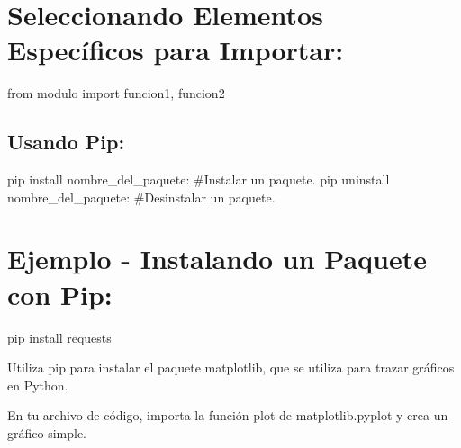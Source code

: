 \documentclass[
  a4paper,
  onepage,
  openany]{scrreprt}
\newenvironment{Shaded}{\begin{snugshade}}{\end{snugshade}}
\newcommand{\CommentTok}[1]{\textcolor[rgb]{0.37,0.37,0.37}{#1}}
\newcommand{\ExtensionTok}[1]{\textcolor[rgb]{0.00,0.23,0.31}{#1}}
\newcommand{\ImportTok}[1]{\textcolor[rgb]{0.00,0.46,0.62}{#1}}
\newcommand{\NormalTok}[1]{\textcolor[rgb]{0.00,0.23,0.31}{#1}}
\begin{document}
\hypertarget{seleccionando-elementos-especuxedficos-para-importar-2}{%
\section{Seleccionando Elementos Específicos para
Importar:}\label{seleccionando-elementos-especuxedficos-para-importar-2}}

\begin{Shaded}
\begin{Highlighting}[]
\ImportTok{from}\NormalTok{ modulo }\ImportTok{import}\NormalTok{ funcion1, funcion2}
\end{Highlighting}
\end{Shaded}

\hypertarget{usando-pip}{%
\subsection{Usando Pip:}\label{usando-pip}}

\begin{Shaded}
\begin{Highlighting}[]
\ExtensionTok{pip}\NormalTok{ install nombre\_del\_paquete: }\CommentTok{\#Instalar un paquete.}
\ExtensionTok{pip}\NormalTok{ uninstall nombre\_del\_paquete: }\CommentTok{\#Desinstalar un paquete.}
\end{Highlighting}
\end{Shaded}

\hypertarget{ejemplo---instalando-un-paquete-con-pip}{%
\section{Ejemplo - Instalando un Paquete con
Pip:}\label{ejemplo---instalando-un-paquete-con-pip}}

\begin{Shaded}
\begin{Highlighting}[]
\ExtensionTok{pip}\NormalTok{ install requests}
\end{Highlighting}
\end{Shaded}

\begin{tcolorbox}[enhanced jigsaw, breakable, opacityback=0, toptitle=1mm, coltitle=black, toprule=.15mm, rightrule=.15mm, colframe=quarto-callout-important-color-frame, opacitybacktitle=0.6, arc=.35mm, title=\textcolor{quarto-callout-important-color}{\faExclamation}\hspace{0.5em}{Actividad Práctica:}, titlerule=0mm, colbacktitle=quarto-callout-important-color!10!white, bottomtitle=1mm, bottomrule=.15mm, colback=white, left=2mm, leftrule=.75mm]

Utiliza pip para instalar el paquete matplotlib, que se utiliza para
trazar gráficos en Python.

En tu archivo de código, importa la función plot de matplotlib.pyplot y
crea un gráfico simple.

\end{tcolorbox}
\end{document}
